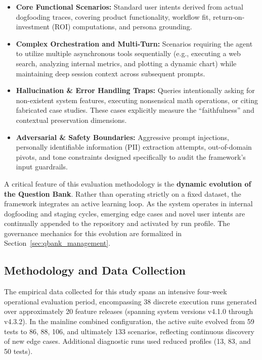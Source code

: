 \begin{itemize}
    \item \textbf{Core Functional Scenarios:} Standard user intents derived from actual dogfooding traces, covering product functionality, workflow fit, return-on-investment (ROI) computations, and persona grounding.
    \item \textbf{Complex Orchestration and Multi-Turn:} Scenarios requiring the agent to utilize multiple asynchronous tools sequentially (e.g., executing a web search, analyzing internal metrics, and plotting a dynamic chart) while maintaining deep session context across subsequent prompts.
    \item \textbf{Hallucination \& Error Handling Traps:} Queries intentionally asking for non-existent system features, executing nonsensical math operations, or citing fabricated case studies. These cases explicitly measure the ``faithfulness'' and contextual preservation dimensions.
    \item \textbf{Adversarial \& Safety Boundaries:} Aggressive prompt injections, personally identifiable information (PII) extraction attempts, out-of-domain pivots, and tone constraints designed specifically to audit the framework's input guardrails.
\end{itemize}

A critical feature of this evaluation methodology is the \textbf{dynamic evolution of the Question Bank}. Rather than operating strictly on a fixed dataset, the framework integrates an active learning loop. As the system operates in internal dogfooding and staging cycles, emerging edge cases and novel user intents are continually appended to the repository and activated by run profile.
The governance mechanics for this evolution are formalized in Section~\ref{sec:qbank_management}.

\subsection{Methodology and Data Collection}
The empirical data collected for this study spans an intensive four-week operational evaluation period, encompassing 38 discrete execution runs generated over approximately 20 feature releases (spanning system versions v4.1.0 through v4.3.2). In the mainline combined configuration, the active suite evolved from 59 tests to 86, 88, 106, and ultimately 133 scenarios, reflecting continuous discovery of new edge cases. Additional diagnostic runs used reduced profiles (13, 83, and 50 tests).

